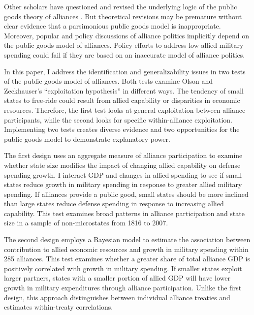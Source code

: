\documentclass[12pt]{article}
\begin{document}
Other scholars have questioned and revised the underlying logic of the public goods theory of alliances \citep{Palmer1990, SandlerHartley2001, Norrlof2010}.  
But theoretical revisions may be premature without clear evidence that a parsimonious public goods model is inappropriate.
Moreover, popular and policy discussions of alliance politics implicitly depend on the public goods model of alliances. 
Policy efforts to address low allied military spending could fail if they are based on an inaccurate model of alliance politics. 


In this paper, I address the identification and generalizability issues in two tests of the public goods model of alliances.  
Both tests examine Olson and Zeckhauser's ``exploitation hypothesis'' in different ways.   
The tendency of small states to free-ride could result from allied capability or disparities in economic resources.
Therefore, the first test looks at general exploitation between alliance participants, while the second looks for specific within-alliance exploitation. 
Implementing two tests creates diverse evidence and two opportunities for the public goods model to demonstrate explanatory power. 


The first design uses an aggregate measure of alliance participation to examine whether state size modifies the impact of changing allied capability on defense spending growth.
I interact GDP and changes in allied spending to see if small states reduce growth in military spending in response to greater allied military spending. 
If alliances provide a public good, small states should be more inclined than large states reduce defense spending in response to increasing allied capability. 
This test examines broad patterns in alliance participation and state size in a sample of non-microstates from 1816 to 2007. 


The second design employs a Bayesian model to estimate the association between contribution to allied economic resources and growth in military spending within 285 alliances. 
This test examines whether a greater share of total alliance GDP is positively correlated with growth in military spending. 
If smaller states exploit larger partners, states with a smaller portion of allied GDP will have lower growth in military expenditures through alliance participation.
Unlike the first design, this approach distinguishes between individual alliance treaties and estimates within-treaty correlations. 
\end{document}
